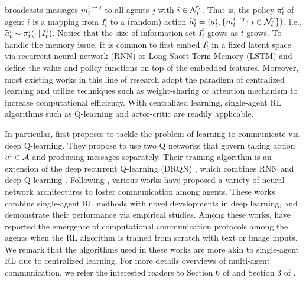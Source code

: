    broadcasts messages $m_t^{i\rightarrow j}$ to all agents $j$ with $i \in \mathcal{N}_t^j$. That is,  the policy $\pi_t^i$ of agent $i$ is a mapping from $I^i_t$  to 
   a (random) action  $\widetilde a_t^i =  (a_t^i, \{ m_{t}^{i\rightarrow j} \colon   i \in \mathcal{N}_t^j \})$, i.e., $\widetilde a_t^i \sim \pi_t^i ( \cdot {\,|\,} I_t^i)$. 
   Notice that the 
   size of information  set  $I_t^i$ grows as $t$ grows. To handle the memory issue, it is common to first embed $I_t^i$ in a fixed latent space via recurrent neural network (RNN)  or Long Short-Term Memory (LSTM)  \cite{hochreiter1997long} and define the value  and policy functions on top of the embedded features. Moreover, most existing works in this line of research adopt the paradigm of centralized learning and utilize  techniques such as weight-sharing or attention mechanism \cite{vaswani2017attention} to increase computational efficiency.  With centralized learning, single-agent RL algorithms such as Q-learning and actor-critic are readily applicable.    
   
 In particular, 
    \cite{foerster2016learning} first proposes to tackle the problem of learning to communicate via deep Q-learning. They propose  to use two Q networks that govern taking action $a^i \in \mathcal{A}$ and producing messages separately. Their training algorithm is an extension of the deep recurrent Q-learning (DRQN) \cite{hausknecht2015deep}, which combines RNN and deep Q-learning \cite{mnih2015human}. Following  \cite{foerster2016learning}, various works  \cite{jorge2016learning,sukhbaatar2016learning, havrylov2017emergence,  das2017learning,  peng2017multiagent, mordatch2018emergence, jiang2018learning, jiang2018graph, celikyilmaz2018deep, das2018tarmac, lazaridou2018emergence, cogswell2019emergence} have proposed a variety of neural network architectures to foster communication among agents. 
 These works combine single-agent RL methods with novel  developments in deep learning, and demonstrate their performance  via empirical studies. 
Among these works, \cite{das2017learning, havrylov2017emergence, mordatch2018emergence,lazaridou2018emergence,cogswell2019emergence} have reported the emergence of computational communication protocols among the agents when the RL algorithm is trained from scratch with text or image inputs.  We remark that the algorithms used in these works are more akin to single-agent RL due to centralized learning. For more details overviews of  multi-agent  communication, we  refer the interested readers to Section 6 of  \cite{oroojlooyjadid2019review} and Section 3 of \cite{hernandez2018multiagent}. 



